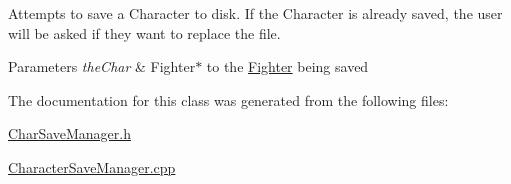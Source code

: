 Attempts to save a Character to disk. If the Character is already saved, the user will be asked if they want to replace the file. 
\begin{DoxyParams}{Parameters}
{\em the\+Char} & Fighter$\ast$ to the \hyperlink{class_fighter}{Fighter} being saved \\
\hline
\end{DoxyParams}


The documentation for this class was generated from the following files\+:\begin{DoxyCompactItemize}
\item 
\hyperlink{_char_save_manager_8h}{Char\+Save\+Manager.\+h}\item 
\hyperlink{_character_save_manager_8cpp}{Character\+Save\+Manager.\+cpp}\end{DoxyCompactItemize}
